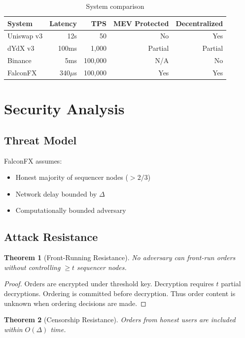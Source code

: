 \documentclass[11pt,a4paper]{article}
\newtheorem{theorem}{Theorem}
\begin{document}
\begin{table}[h]
\centering
\begin{tabular}{lrrrr}
\toprule
\textbf{System} & \textbf{Latency} & \textbf{TPS} & \textbf{MEV Protected} & \textbf{Decentralized} \\
\midrule
Uniswap v3 & 12s & 50 & No & Yes \\
dYdX v3 & 100ms & 1,000 & Partial & Partial \\
Binance & 5ms & 100,000 & N/A & No \\
FalconFX & 340$\mu$s & 100,000 & Yes & Yes \\
\bottomrule
\end{tabular}
\caption{System comparison}
\end{table}

\section{Security Analysis}

\subsection{Threat Model}

FalconFX assumes:
\begin{itemize}
    \item Honest majority of sequencer nodes ($> 2/3$)
    \item Network delay bounded by $\Delta$
    \item Computationally bounded adversary
\end{itemize}

\subsection{Attack Resistance}

\begin{theorem}[Front-Running Resistance]
No adversary can front-run orders without controlling $\geq t$ sequencer nodes.
\end{theorem}

\begin{proof}
Orders are encrypted under threshold key. Decryption requires $t$ partial decryptions. Ordering is committed before decryption. Thus order content is unknown when ordering decisions are made.
\end{proof}

\begin{theorem}[Censorship Resistance]
Orders from honest users are included within $O(\Delta)$ time.
\end{theorem}
\end{document}
